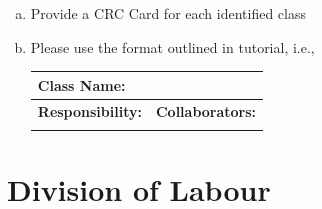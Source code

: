 \documentclass[]{article}
\begin{document}
\begin{enumerate}[a)]
	\item Provide a CRC Card for each identified class
	\item Please use the format outlined in tutorial, i.e., 
	\begin{table}[ht]
		\centering
		\begin{tabular}{|p{5cm}|p{5cm}|}
		\hline 
		 \multicolumn{2}{|l|}{\textbf{Class Name:}} \\
		\hline
		\textbf{Responsibility:} & \textbf{Collaborators:} \\
		\hline
		\vspace{1in} & \\
		\hline
		\end{tabular}
	\end{table}
	
\end{enumerate}

\appendix
\newpage
\section{Division of Labour}
\label{sec:division_of_labour}
\end{document}
